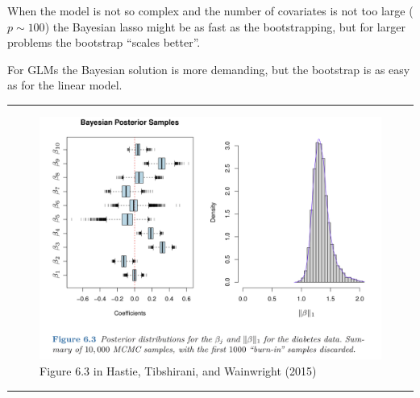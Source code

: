 \documentclass[
  letterpaper,
  DIV=11,
  numbers=noendperiod]{scrartcl}
\begin{document}
When the model is not so complex and the number of covariates is not too
large (\(p\sim 100\)) the Bayesian lasso might be as fast as the
bootstrapping, but for larger problems the bootstrap ``scales better''.

For GLMs the Bayesian solution is more demanding, but the bootstrap is
as easy as for the linear model.

\begin{center}\rule{0.5\linewidth}{0.5pt}\end{center}

\begin{figure}

{\centering \includegraphics[width=1\textwidth,height=\textheight]{./HTWFig63.jpg}

}

\caption{Figure 6.3 in Hastie, Tibshirani, and Wainwright (2015)}

\end{figure}

\begin{center}\rule{0.5\linewidth}{0.5pt}\end{center}
\end{document}
